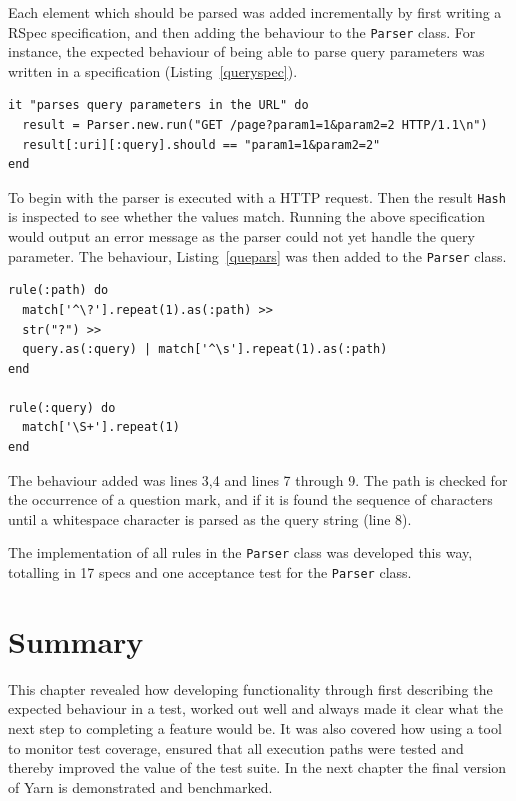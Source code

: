 Each element which should be parsed was added incrementally by first writing a
RSpec specification, and then adding the behaviour to the \texttt{Parser}
class. For instance, the expected behaviour of being able to parse query
parameters was written in a specification (Listing~\ref{queryspec}).

\bigskip
\begin{lstlisting}[label=queryspec,caption=Parser query parameter support specification (spec/yarn/parser\_spec.rb:54).]
it "parses query parameters in the URL" do
  result = Parser.new.run("GET /page?param1=1&param2=2 HTTP/1.1\n")
  result[:uri][:query].should == "param1=1&param2=2"
end
\end{lstlisting}

To begin with the parser is executed with a HTTP request. Then the result
\texttt{Hash} is inspected to see whether the values match. Running the above
specification would output an error message as the parser could not yet
handle the query parameter. The behaviour, Listing~\ref{quepars} was then
added to the \texttt{Parser} class.

\bigskip
\begin{lstlisting}[label=quepars,caption=URL query parameter support (lib/yarn/parser.rb:31).]
rule(:path) do 
  match['^\?'].repeat(1).as(:path) >> 
  str("?") >> 
  query.as(:query) | match['^\s'].repeat(1).as(:path)
end

rule(:query) do
  match['\S+'].repeat(1)
end
\end{lstlisting}

The behaviour added was lines 3,4 and lines 7 through 9. The path is checked
for the occurrence of a question mark, and if it is found the sequence of
characters until a whitespace character is parsed as the query string (line 8).

The implementation of all rules in the \texttt{Parser} class was developed
this way, totalling in 17 specs and one acceptance test for the
\texttt{Parser} class.


\section{Summary}
This chapter revealed how developing functionality through first describing
the expected behaviour in a test, worked out well and always made it clear
what the next step to completing a feature would be. It was also covered how
using a tool to monitor test coverage, ensured that all execution paths were
tested and thereby improved the value of the test suite.
In the next chapter the final version of Yarn is demonstrated and benchmarked.
